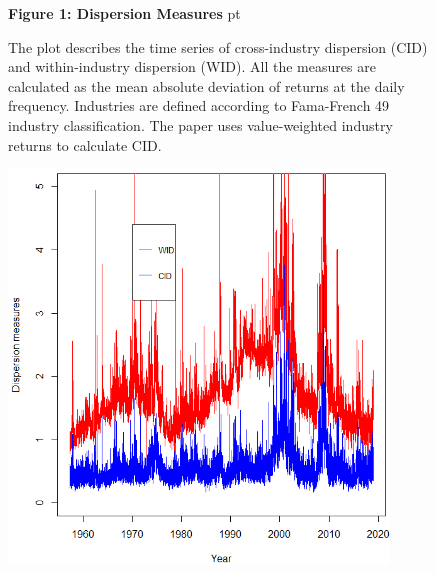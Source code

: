 \documentclass[12pt]{article}
\begin{document}
\begin{figure}[h!]
\textbf{Figure 1: Dispersion Measures}
 pt
\begin{flushleft}
{The plot describes the time series of cross-industry dispersion (CID) and within-industry dispersion (WID). All the measures are calculated as the mean absolute deviation of returns at the daily frequency. Industries are defined according to Fama-French 49 industry classification. The paper uses value-weighted industry returns to calculate CID.}
\end{flushleft}
\centering
\vspace{0.64cm}
\includegraphics[width=0.9\textwidth]{paper_b2/Figure1.png}
\end{figure}
\end{document}
